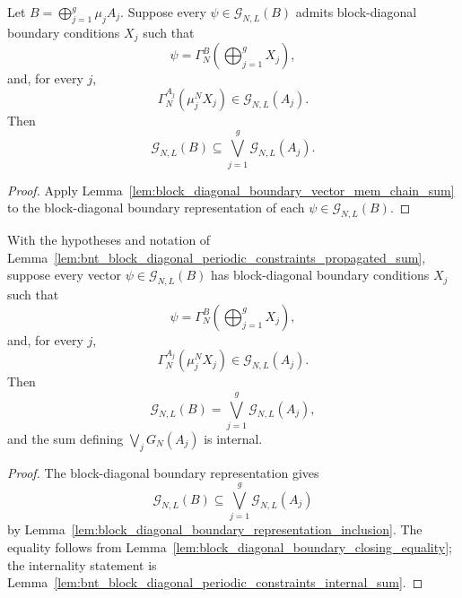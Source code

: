 \begin{lemma}
    \label{lem:block_diagonal_boundary_representation_inclusion}
    \leanok
    Let $B=\bigoplus_{j=1}^g\mu_jA_j$. Suppose every
    $\psi\in\mathcal G_{N,L}(B)$ admits block-diagonal boundary conditions
    $X_j$ such that
    \[
        \psi=\Gamma_N^B\!\left(\bigoplus_{j=1}^gX_j\right),
    \]
    and, for every $j$,
    \[
        \Gamma_N^{A_j}(\mu_j^N X_j)\in\mathcal G_{N,L}(A_j).
    \]
    Then
    \[
        \mathcal G_{N,L}(B)
        \subseteq
        \bigvee_{j=1}^g\mathcal G_{N,L}(A_j).
    \]
\end{lemma}

\begin{proof}
    \leanok
    Apply Lemma~\ref{lem:block_diagonal_boundary_vector_mem_chain_sum} to the
    block-diagonal boundary representation of each
    $\psi\in\mathcal G_{N,L}(B)$.
\end{proof}

\begin{lemma}
    \label{lem:bnt_block_diagonal_boundary_representation_equality}
    \leanok
    With the hypotheses and notation of
    Lemma~\ref{lem:bnt_block_diagonal_periodic_constraints_propagated_sum}, suppose
    every vector $\psi\in\mathcal G_{N,L}(B)$ has block-diagonal boundary
    conditions $X_j$ such that
    \[
        \psi=\Gamma_N^B\!\left(\bigoplus_{j=1}^gX_j\right),
    \]
    and, for every $j$,
    \[
        \Gamma_N^{A_j}(\mu_j^N X_j)\in\mathcal G_{N,L}(A_j).
    \]
    Then
    \[
        \mathcal G_{N,L}(B)=
        \bigvee_{j=1}^g\mathcal G_{N,L}(A_j),
    \]
    and the sum defining $\bigvee_jG_N(A_j)$ is internal.
\end{lemma}

\begin{proof}
    \leanok
    The block-diagonal boundary representation gives
    \[
        \mathcal G_{N,L}(B)
        \subseteq
        \bigvee_{j=1}^g\mathcal G_{N,L}(A_j)
    \]
    by Lemma~\ref{lem:block_diagonal_boundary_representation_inclusion}. The
    equality follows from Lemma~\ref{lem:block_diagonal_boundary_closing_equality};
    the internality statement is
    Lemma~\ref{lem:bnt_block_diagonal_periodic_constraints_internal_sum}.
\end{proof}

